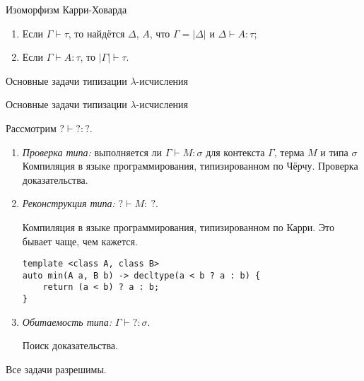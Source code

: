 \documentclass[aspectratio=169]{beamer}
\begin{document}
\begin{frame}{Изоморфизм Карри-Ховарда}
\begin{thm}
\begin{enumerate}
\item Если $\Gamma\vdash\tau$, то найдётся $\Delta$, $A$, что $\Gamma = |\Delta|$ и $\Delta \vdash A : \tau$;
\item Если $\Gamma \vdash A : \tau$, то $|\Gamma| \vdash \tau$.
\end{enumerate}
\end{thm}

\end{frame}

\begin{frame}{}
\begin{center}\Large Основные задачи типизации $\lambda$-исчисления\end{center}
\end{frame}

\begin{frame}[fragile]{Основные задачи типизации $\lambda$-исчисления}

Рассмотрим $? \vdash ? : ?$.

		\begin{enumerate}
			\item \emph{Проверка типа:} выполняется ли $\Gamma\vdash M:\sigma$ для контекста $\Gamma\text{, терма }M\text{ и типа }\sigma$\\

{\color{gray}Компиляция в языке программирования, типизированном по Чёрчу. Проверка доказательства.}
			\item \emph{Реконструкция типа:} $?\vdash M:\:?$.

{\color{gray}Компиляция в языке программирования, типизированном по Карри. Это бывает чаще, чем кажется.}

\verb!template <class A, class B>!\\
\verb!auto min(A a, B b) -> decltype(a < b ? a : b) {!\\
\verb!    return (a < b) ? a : b;!\\
\verb!}!

			\item \emph{Обитаемость типа:} $\Gamma\vdash ?:\sigma$.

{\color{gray}Поиск доказательства.}
		\end{enumerate}
Все задачи разрешимы.
\end{frame}
\end{document}
